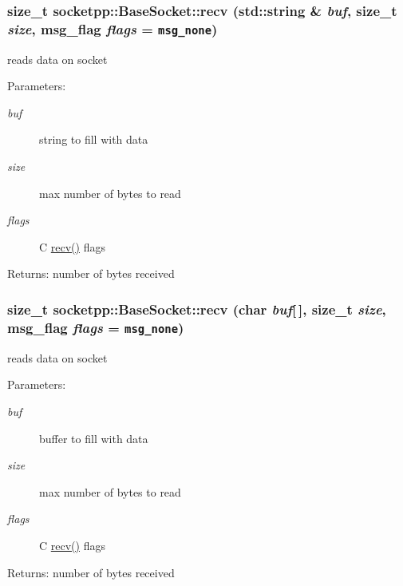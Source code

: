 \begin{CompactItemize}
{\subsubsection[{recv}]{\setlength{\rightskip}{0pt plus 5cm}size\_\-t socketpp::BaseSocket::recv (std::string \& {\em buf}, \/  size\_\-t {\em size}, \/  msg\_\-flag {\em flags} = {\tt msg\_\-none})}}
\label{classsocketpp_1_1BaseSocket_d36a1139d9e931d172e9c45171609b66}


reads data on socket 

\begin{Desc}
\item[Parameters:]
\begin{description}
\item[{\em buf}]string to fill with data \item[{\em size}]max number of bytes to read \item[{\em flags}]C \hyperlink{classsocketpp_1_1BaseSocket_d74160ecc96cacec56f61d36f9ab747d}{recv()} flags \end{description}
\end{Desc}
\begin{Desc}
\item[Returns:]number of bytes received \end{Desc}
\hypertarget{classsocketpp_1_1BaseSocket_d74160ecc96cacec56f61d36f9ab747d}{
\subsubsection[{recv}]{\setlength{\rightskip}{0pt plus 5cm}size\_\-t socketpp::BaseSocket::recv (char {\em buf}\mbox{[}$\,$\mbox{]}, \/  size\_\-t {\em size}, \/  msg\_\-flag {\em flags} = {\tt msg\_\-none})}}
\label{classsocketpp_1_1BaseSocket_d74160ecc96cacec56f61d36f9ab747d}


reads data on socket 

\begin{Desc}
\item[Parameters:]
\begin{description}
\item[{\em buf}]buffer to fill with data \item[{\em size}]max number of bytes to read \item[{\em flags}]C \hyperlink{classsocketpp_1_1BaseSocket_d74160ecc96cacec56f61d36f9ab747d}{recv()} flags \end{description}
\end{Desc}
\begin{Desc}
\item[Returns:]number of bytes received \end{Desc}
\hypertarget{classsocketpp_1_1BaseSocket_8ba6376183fbcce5266775ecc1749e0a}{
}
\end{CompactItemize}
